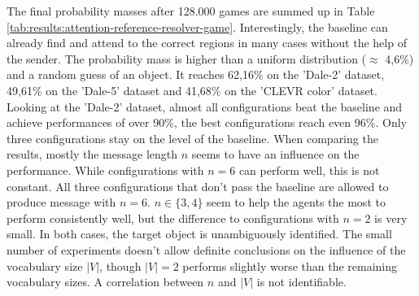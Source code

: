 \documentclass[11pt,a4paper]{article}
\begin{document}

The final probability masses after 128.000 games are summed up in Table \ref{tab:results:attention-reference-resolver-game}.
Interestingly, the baseline can already find and attend to the correct regions in many cases without the help of the sender.
The probability mass is higher than a uniform distribution ($\approx$ 4,6\%) and a random guess of an object.
It reaches 62,16\% on the 'Dale-2' dataset, 49,61\% on the 'Dale-5' dataset and 41,68\% on the 'CLEVR color' dataset.
Looking at the 'Dale-2' dataset, almost all configurations beat the baseline and achieve performances of over 90\%, the best configurations reach even 96\%.
Only three configurations stay on the level of the baseline. %
When comparing the results, mostly the message length $n$ seems to have an influence on the performance.
While configurations with $n=6$ can perform well, this is not constant.
All three configurations that don't pass the baseline are allowed to produce message with $n=6$.
$n \in \{3,4\}$ seem to help the agents the most to perform consistently well, but the difference to configurations with $n=2$ is very small.
In both cases, the target object is unambiguously identified.
The small number of experiments doesn't allow definite conclusions on the influence of the vocabulary size $|V|$, though $|V|=2$ performs slightly worse than the remaining vocabulary sizes.
A correlation between $n$ and $|V|$ is not identifiable.
\end{document}

